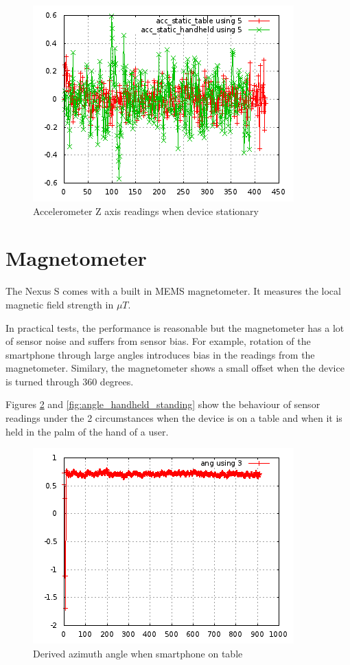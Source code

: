 \begin{figure}\centering
    \includegraphics{figures/accel_static.png}
    \caption{Accelerometer Z axis readings when device stationary\label{fig:accel_static}}
\end{figure}

\section{Magnetometer}

The Nexus S comes with a built in MEMS magnetometer.
It measures the local magnetic field strength in $\mu T$.

In practical tests, the performance is reasonable but the magnetometer has a 
lot of sensor noise and suffers from sensor bias. For example, rotation of 
the smartphone through large angles introduces bias in the readings from the 
magnetometer. Similary, the magnetometer shows a small offset when the device is 
turned through 360 degrees.

Figures \ref{fig:angle_stationary_table} and \ref{fig:angle_handheld_standing}
show the behaviour of sensor readings under the 2 circumstances when the 
device is on a table and when it is held in the palm of the hand of a user.

\begin{figure}\centering
    \includegraphics{figures/angle_stationary_table.png}
    \caption{Derived azimuth angle when smartphone on table\label{fig:angle_stationary_table}}
\end{figure}

